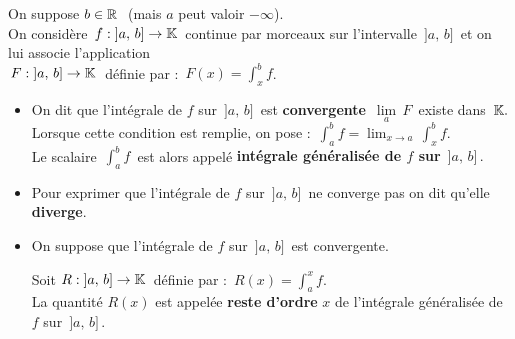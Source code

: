 On suppose \(b\in\mathbb{R}\ \) (mais $a$ peut valoir \(-\infty\)).\vspace{0.2cm}\\
On considère \(\,f:\;]a,\,b]\to\mathbb{K}\,\) continue par morceaux sur l'intervalle \(\,]a,\,b]\,\) et on lui associe l'application\vspace{0.1cm}\\
\(\,F:\;]a,\,b]\to\mathbb{K}\;\) définie par : \(\,\displaystyle F(x)=\int_{x}^{b}f\).
\begin{itemize}[leftmargin=0.5cm, label=•]
    \item On dit que l'intégrale de $f$ sur \(\,]a,\,b]\,\) est \textbf{convergente} \ssi \(\,\underset{a}{\lim}\,F\,\) existe dans \(\,\mathbb{K}.\)\\
    Lorsque cette condition est remplie, on pose : \(\,\displaystyle \int_{a}^{b}\!f=\lim_{x\to a}\,\int_{x}^{b}\!f\).\\
    Le scalaire \(\,\displaystyle \int_{a}^{b}\!f\,\) est alors appelé \textbf{intégrale généralisée de $f$ sur} \(\,]a,\,b]\,.\)\vspace{0.2cm}

    \item Pour exprimer que l'intégrale de $f$ sur \(\,]a,\,b]\,\) ne converge pas on dit qu'elle \textbf{diverge}.\vspace{0.4cm}
    
    \item On suppose que l'intégrale de $f$ sur \(\,]a,\,b]\,\) est convergente.\vspace{-0.2cm}
    
    \hspace{4cm}Soit \(R:\;]a,\,b]\to\mathbb{K}\,\) définie par : \(\,\displaystyle R(x)=\int_{a}^{x}\!f\).\vspace{0.1cm}\\
    La quantité \(R(x)\) est appelée \textbf{reste d'ordre} $x$ de l'intégrale généralisée de $f$ sur \(\,]a,\,b]\,\).
\end{itemize}

\vspace{2cm}


